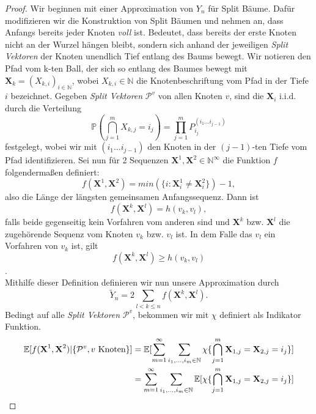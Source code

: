 \begin{proof}
  Wir beginnen mit einer Approximation von $Y_n$ für Split Bäume. Dafür modifizieren wir die Konstruktion von Split Bäumen und nehmen an, dass Anfangs bereits jeder Knoten \textit{voll} ist. Bedeutet, dass bereits der erste Knoten nicht an der Wurzel hängen bleibt, sondern sich anhand der jeweiligen \textit{Split Vektoren} der Knoten unendlich Tief entlang des Baums bewegt. Wir notieren den Pfad vom k-ten Ball, der sich so entlang des Baumes bewegt mit $\textbf{X}_k = (X_{k,i})_{i \in \mathbb{N}}$, wobei $X_{k,i} \in \mathbb{N}$ die Knotenbeschriftung vom Pfad in der  Tiefe $i$ bezeichnet. Gegeben \textit{Split Vektoren} $\mathcal{P}^{v}$ von allen Knoten $v$, sind die $\textbf{X}_i$ i.i.d. durch die Verteilung 
  \begin{equation}
    \label{independency sequence depth}
    \mathbb{P}(\bigcap_{j = 1}^{m}X_{k,j} = i_j) = \prod_{j=1}^{m}P_{i_j}^{(i_1...i_{j-1})}
  \end{equation}
  festgelegt, wobei wir mit $(i_1...i_{j-1})$ den Knoten in der $(j-1)$-ten Tiefe vom Pfad identifizieren. Sei nun für 2 Sequenzen $\textbf{X}^1,\textbf{X}^2 \in \mathbb{N}^{\infty}$ die Funktion $f$ folgendermaßen definiert:
  \[
    f(\textbf{X}^1,\textbf{X}^2) = min(\{i: \textbf{X}^1_i \neq \textbf{X}^2_i\}) - 1,
  \]
  also die Länge der längsten gemeinsamen Anfangssequenz. Dann ist 
  \[
    f(\textbf{X}^k,\textbf{X}^l) = h(v_k,v_l),
  \]
  falls beide gegenseitig kein Vorfahren vom anderen sind und $\textbf{X}^k$ bzw. $\textbf{X}^l$ die zugehörende Sequenz vom Knoten $v_k$ bzw. $v_l$ ist. In dem Falle das $v_l$ ein Vorfahren von $v_k$ ist, gilt 
  \begin{equation}
    \label{inequality for height}
    f(\textbf{X}^k,\textbf{X}^l) \geq h(v_k,v_l)
  \end{equation}. \\
  Mithilfe dieser Definition definieren wir nun unsere Approximation durch 
  \[
    \tilde{Y}_n = 2\sum_{l < k \leq n}f(\textbf{X}^k,\textbf{X}^l).
  \]
Bedingt auf alle \textit{Split Vektoren} $\mathcal{P}^{v}$, bekommen wir mit $\chi$ definiert als Indikator Funktion.
\begin{align}
\mathbb{E}[f(\textbf{X}^1,\textbf{X}^2)|\{\mathcal{P}^{v}, v \textnormal{ Knoten}\}] &= \mathbb{E}[\sum_{m=1}^{\infty}\sum_{i_1,...,i_m \in \mathbb{N}}\chi\{\bigcap_{j=1}^{m}\textbf{X}_{1,j}=\textbf{X}_{2,j} = i_j \}] \nonumber\\
&=\sum_{m=1}^{\infty}\sum_{i_1,...,i_m \in \mathbb{N}}\mathbb{E}[\chi\{\bigcap_{j=1}^{m}\textbf{X}_{1,j}=\textbf{X}_{2,j} = i_j \}] \nonumber\\

\end{align}
\end{proof}

